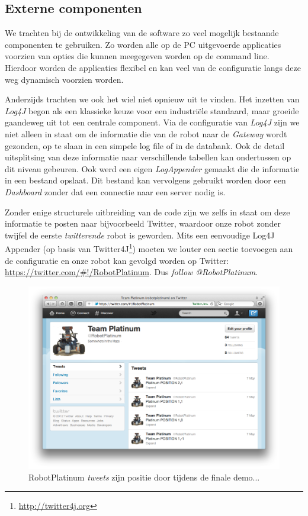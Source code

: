 \documentclass[12pt,a4paper]{report}
\begin{document}
\subsection{Externe componenten}

We trachten bij de ontwikkeling van de software zo veel mogelijk bestaande componenten te gebruiken. Zo worden alle op de PC uitgevoerde applicaties voorzien van opties die kunnen meegegeven worden op de command line. Hierdoor worden de applicaties flexibel en kan veel van de configuratie langs deze weg dynamisch voorzien worden.

Anderzijds trachten we ook het wiel niet opnieuw uit te vinden. Het inzetten van \emph{Log4J} begon als een klassieke keuze voor een industri\"ele standaard, maar groeide gaandeweg uit tot een centrale component. Via de configuratie van \emph{Log4J} zijn we niet alleen in staat om de informatie die van de robot naar de \emph{Gateway} wordt gezonden, op te slaan in een simpele log file of in de databank. Ook de detail uitsplitsing van deze informatie naar verschillende tabellen kan ondertussen op dit niveau gebeuren. Ook werd een eigen \emph{LogAppender} gemaakt die de informatie in een bestand opslaat. Dit bestand kan vervolgens gebruikt worden door een \emph{Dashboard} zonder dat een connectie naar een server nodig is.

Zonder enige structurele uitbreiding van de code zijn we zelfs in staat om deze informatie te posten naar bijvoorbeeld Twitter, waardoor onze robot zonder twijfel de eerste \emph{twitterende} robot is geworden. Mits een eenvoudige Log4J Appender (op basis van Twitter4J\footnote{\url{http://twitter4j.org}}) moeten we louter een sectie toevoegen aan de configuratie en onze robot kan gevolgd worden op Twitter: \url{https://twitter.com/\#!/RobotPlatinum}. Dus \emph{follow @RobotPlatinum}.

\begin{figure}[htbp]
  \centering
  \includegraphics[width=120mm]{resources/twitter.png}
  \caption{RobotPlatinum \emph{tweets} zijn positie door tijdens de finale demo...}
  \label{fig:twitter}
\end{figure}
\end{document}
